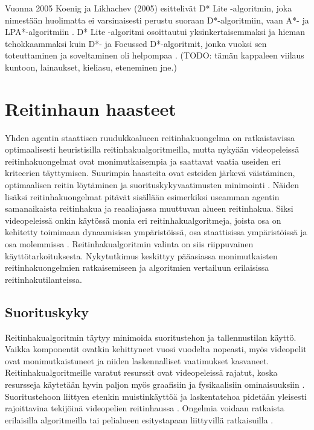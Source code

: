 \documentclass[utf8]{gradu3}
\begin{document}
Vuonna 2005 Koenig ja Likhachev (2005) esittelivät D* Lite -algoritmin, joka nimestään huolimatta ei varsinaisesti perustu suoraan D*-algoritmiin, vaan A*- ja LPA*-algoritmiin \parencite{koenig2005fast}. D* Lite -algoritmi osoittautui yksinkertaisemmaksi ja hieman tehokkaammaksi kuin D*- ja Focussed D*-algoritmit, jonka vuoksi sen toteuttaminen ja soveltaminen oli helpompaa \parencite{koenig2005fast}. (TODO: tämän kappaleen viilaus kuntoon, lainaukset, kieliasu, eteneminen jne.)

\section{Reitinhaun haasteet}

Yhden agentin staattisen ruudukkoalueen reitinhakuongelma on ratkaistavissa optimaalisesti heuristisilla reitinhakualgoritmeilla, mutta nykyään videopeleissä reitinhakuongelmat ovat monimutkaisempia ja saattavat vaatia useiden eri kriteerien täyttymisen. Suurimpia haasteita ovat esteiden järkevä väistäminen, optimaalisen reitin löytäminen ja suorituskykyvaatimusten minimointi \parencite{abd2015comprehensive,cui2011based}. Näiden lisäksi reitinhakuongelmat pitävät sisällään esimerkiksi useamman agentin samanaikaista reitinhakua ja reaaliajassa muuttuvan alueen reitinhakua. Siksi videopeleissä onkin käytössä monia eri reitinhakualgoritmeja, joista osa on kehitetty toimimaan dynaamisissa ympäristöissä, osa staattisissa ympäristöissä ja osa molemmissa \parencite{lawande2022systematic}. Reitinhakualgoritmin valinta on siis riippuvainen käyttötarkoituksesta. Nykytutkimus keskittyy pääasiassa monimutkaisten reitinhakuongelmien ratkaisemiseen ja algoritmien vertailuun erilaisissa reitinhakutilanteissa.

\subsection{Suorituskyky}

Reitinhakualgoritmin täytyy minimoida suoritustehon ja tallennustilan käyttö. Vaikka komponentit ovatkin kehittyneet vuosi vuodelta nopeasti, myös videopelit ovat monimutkaistuneet ja niiden laskennalliset vaatimukset kasvaneet. Reitinhakualgoritmeille varatut resurssit ovat videopeleissä rajatut, koska resursseja käytetään hyvin paljon myös graafisiin ja fysikaalisiin ominaisuuksiin \parencite{lawande2022systematic}. Suoritustehoon liittyen etenkin muistinkäyttöä ja laskentatehoa pidetään yleisesti rajoittavina tekijöinä videopelien reitinhaussa \parencite{botea2013pathfinding}. Ongelmia voidaan ratkaista erilaisilla algoritmeilla tai pelialueen esitystapaan liittyvillä ratkaisuilla \parencite{botea2013pathfinding,cui2011based}.
\end{document}
